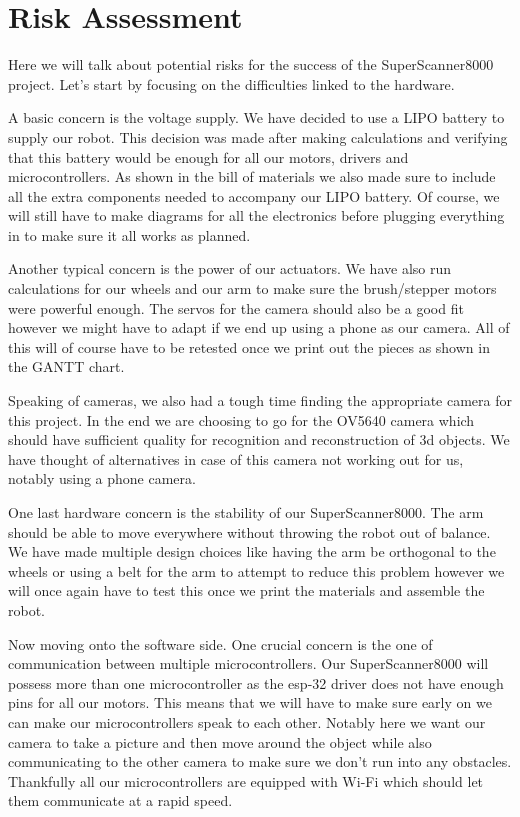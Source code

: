 \documentclass{article}
\begin{document}
\newpage

\section{Risk Assessment}

Here we will talk about potential risks for the success of the SuperScanner8000 project. Let’s start by focusing on the difficulties linked to the hardware. 

A basic concern is the voltage supply. We have decided to use a LIPO battery to supply our robot. This decision was made after making calculations and verifying that this battery would be enough for all our motors, drivers and microcontrollers. As shown in the bill of materials we also made sure to include all the extra components needed to accompany our LIPO battery. Of course, we will still have to make diagrams for all the electronics before plugging everything in to make sure it all works as planned.

Another typical concern is the power of our actuators. We have also run calculations for our wheels and our arm to make sure the brush/stepper motors were powerful enough. The servos for the camera should also be a good fit however we might have to adapt if we end up using a phone as our camera. All of this will of course have to be retested once we print out the pieces as shown in the GANTT chart.

Speaking of cameras, we also had a tough time finding the appropriate camera for this project. In the end we are choosing to go for the OV5640 camera which should have sufficient quality for recognition and reconstruction of 3d objects. We have thought of alternatives in case of this camera not working out for us, notably using a phone camera.

One last hardware concern is the stability of our SuperScanner8000. The arm should be able to move everywhere without throwing the robot out of balance. We have made multiple design choices like having the arm be orthogonal to the wheels or using a belt for the arm to attempt to reduce this problem however we will once again have to test this once we print the materials and assemble the robot.


Now moving onto the software side. 
One crucial concern is the one of communication between multiple microcontrollers. Our SuperScanner8000 will possess more than one microcontroller as the esp-32 driver does not have enough pins for all our motors. This means that we will have to make sure early on we can make our microcontrollers speak to each other. Notably here we want our camera to take a picture and then move around the object while also communicating to the other camera to make sure we don’t run into any obstacles. Thankfully all our microcontrollers are equipped with Wi-Fi which should let them communicate at a rapid speed.
\end{document}
